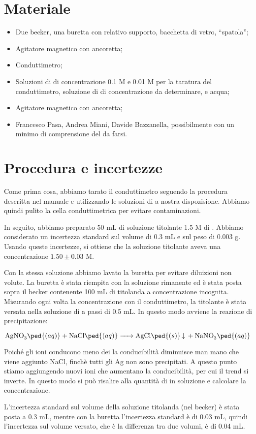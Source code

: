 \section*{Materiale}

\begin{itemize}
        \setlength{\parskip}{-1pt}
        \item{Due becker, una buretta con relativo supporto, bacchetta di vetro, ``spatola'';}
        \item{Agitatore magnetico con ancoretta;}
        \item{Conduttimetro;}
        \item{Soluzioni di  di concentrazione 0.1 M e 0.01 M per la taratura del conduttimetro,
                soluzione di  di concentrazione da determinare,  e acqua;}
        \item{Agitatore magnetico con ancoretta;}
        \item{Francesco Pasa, Andrea Miani, Davide Bazzanella, possibilmente con un minimo di comprensione
                del da farsi.}
\end{itemize}

\section*{Procedura e incertezze}

Come prima cosa, abbiamo tarato il conduttimetro seguendo la procedura descritta nel manuale e utilizzando
le soluzioni di  a nostra dispozisione. Abbiamo quindi pulito la cella conduttimetrica per evitare contaminazioni.

In seguito, abbiamo preparato 50 mL di soluzione titolante 1.5 M di . Abbiamo considerato un
incertezza standard sul volume di 0.3 mL e sul peso di 0.003 g. Usando queste incertezze,
si ottiene che la soluzione titolante aveva una concentrazione $1.50 \pm 0.03$ M.

Con la stessa soluzione abbiamo lavato la buretta per evitare diluizioni non volute. La buretta è stata riempita con
la soluzione rimanente ed è stata posta sopra il becker contenente 100 mL di titolanda a concentrazione incognita.
Misurando ogni volta la concentrazione con il conduttimetro, la titolante è stata versata nella soluzione di 
a passi di 0.5 mL. In questo modo avviene la reazione di precipitazione:

\begin{equation*}
        \ce{AgNO3\ped{(aq)} + NaCl\ped{(aq)} -> AgCl\ped{(s)} v + NaNO3\ped{(aq)}}
\end{equation*}

Poiché gli ioni  conducono meno dei  la conducibilità diminuisce man mano che viene aggiunto NaCl,
finchè tutti gli Ag non sono precipitati. A questo punto stiamo aggiungendo nuovi ioni che aumentano la conducibilità,
per cui il trend si inverte. In questo modo si può risalire alla quantità di  in soluzione e calcolare la concentrazione.

L'incertezza standard sul volume della soluzione titolanda (nel becker) è stata posta a 0.3 mL, mentre con la
buretta l'incertezza standard è di 0.03 mL, quindi l'incertezza sul volume versato, che è la differenza tra due volumi,
è di 0.04 mL.
